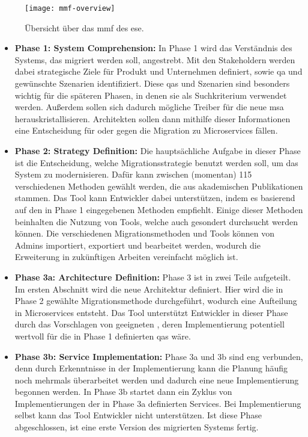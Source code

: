 \begin{figure}
	\centering
	\texttt{[image: mmf-overview]}
	\caption[Übersicht über \acrshort{mmf}]{
		Übersicht über das \gls{mmf} des \gls{ese}.
	}
	\label{fig:expert-material-mmf-overview}
\end{figure}

\begin{itemize}
	\item \textbf{Phase 1: System Comprehension:}
	In Phase 1 wird das Verständnis des Systems, das migriert werden soll, angestrebt.
	Mit den Stakeholdern werden dabei strategische Ziele für Produkt und Unternehmen definiert, sowie \acrfull{qa} und gewünschte Szenarien identifiziert.
	Diese \glspl{qa} und Szenarien sind besonders wichtig für die späteren Phasen, in denen sie als Suchkriterium verwendet werden.
	Außerdem sollen sich dadurch mögliche Treiber für die neue \acrlong{msa} herauskristallisieren.
	Architekten sollen dann mithilfe dieser Informationen eine Entscheidung für oder gegen die Migration zu Microservices fällen.
	\item \textbf{Phase 2: Strategy Definition:}
	Die hauptsächliche Aufgabe in dieser Phase ist die Entscheidung, welche Migrationsstrategie benutzt werden soll, um das System zu modernisieren.
	Dafür kann zwischen (momentan) 115 verschiedenen Methoden gewählt werden, die aus akademischen Publikationen stammen.
	Das Tool kann Entwickler dabei unterstützen, indem es basierend auf den in Phase 1 eingegebenen  Methoden empfiehlt.
	Einige dieser Methoden beinhalten die Nutzung von Tools, welche auch gesondert durchsucht werden können.
	Die verschiedenen Migrationsmethoden und Tools können von Admins importiert, exportiert und bearbeitet werden, wodurch die Erweiterung in zukünftigen Arbeiten vereinfacht möglich ist.
	\item \textbf{Phase 3a: Architecture Definition:}
	Phase 3 ist in zwei Teile aufgeteilt.
	Im ersten Abschnitt wird die neue Architektur definiert.
	Hier wird die in Phase 2 gewählte Migrationsmethode durchgeführt, wodurch eine Aufteilung in Microservices entsteht.
	Das Tool unterstützt Entwickler in dieser Phase durch das Vorschlagen von geeigneten \bpp, deren Implementierung potentiell wertvoll für die in Phase 1 definierten \glspl{qa} wäre.
	\item \textbf{Phase 3b: Service Implementation:}
	Phase 3a und 3b sind eng verbunden, denn durch Erkenntnisse in der Implementierung kann die Planung häufig noch mehrmals überarbeitet werden und dadurch eine neue Implementierung begonnen werden.
	In Phase 3b startet dann ein Zyklus von Im\-ple\-men\-tie\-rung\-en der in Phase 3a definierten Services.
	Bei Implementierung selbst kann das Tool Entwickler nicht unterstützen.
	Ist diese Phase abgeschlossen, ist eine erste Version des migrierten Systems fertig.
\end{itemize}

